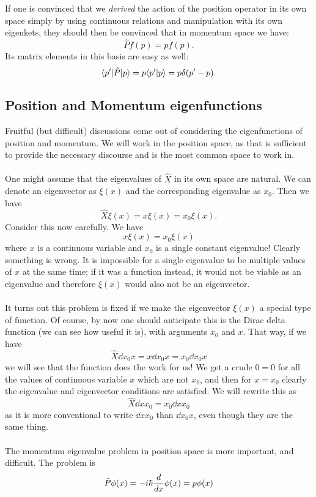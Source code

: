 \\\\
If one is convinced that we \textit{derived} the action of the position operator in its own space simply by using continuous relations and manipulation with its own eigenkets, they should then be convinced that in momentum space we have:
$$
\hat{P}f(p)=pf(p).
$$
Its matrix elements in this basis are easy as well:
$$
\langle p'|\hat{P}|p\rangle=p\langle p'|p\rangle=p\delta(p'-p).
$$
\subsection{Position and Momentum eigenfunctions}
Fruitful (but difficult) discussions come out of considering the eigenfunctions of position and momentum. We will work in the position space, as that is sufficient to provide the necessary discourse and is the most common space to work in.
\\\\
One might assume that the eigenvalues of $\hat{X}$ in its own space are natural.
We can denote an eigenvector as $\xi(x)$ and the corresponding eigenvalue as $x_{0}$. Then we have
$$
\hat{X}\xi(x)=x\xi(x)=x_{0}\xi(x).
$$
Consider this now carefully. We have 
$$
x\xi(x)=x_{0}\xi(x)
$$
where $x$ is a continuous variable and $x_{0}$ is a single constant eigenvalue! Clearly something is wrong. It is impossible for a single eigenvalue to be multiple values of $x$ at the same time; if it was a function instead, it would not be viable as an eigenvalue and therefore $\xi(x)$ would also not be an eigenvector.
\\\\
It turns out this problem is fixed if we make the eigenvector $\xi(x)$ a special type of function. Of course, by now one should anticipate this is the Dirac delta function (we can see how useful it is), with arguments $x_{0}$ and $x$. That way, if we have
$$
\hat{X}\dd{x_{0}}{x}=x\dd{x_{0}}{x}=x_{0}\dd{x_{0}}{x}
$$
we will see that the function does the work for us! We get a crude $0=0$ for all the values of continuous variable $x$ which are not $x_{0}$, and then for $x=x_{0}$ clearly the eigenvalue and eigenvector conditions are satisfied. We will rewrite this as 
$$
\hat{X}\dd{x}{x_{0}}=x_{0}\dd{x}{x_{0}}
$$
as it is more conventional to write $\dd{x}{x_{0}}$ than $\dd{x_{0}}{x}$, even though they are the same thing. 
\\\\
The momentum eigenvalue problem in position space is more important, and difficult. The problem is
$$
\hat{P}\phi(x)=-i\hbar\frac{d}{d x}\phi(x)=p\phi(x)
$$
